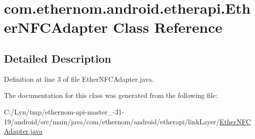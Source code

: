 \hypertarget{classcom_1_1ethernom_1_1android_1_1etherapi_1_1_ether_n_f_c_adapter}{}\section{com.\+ethernom.\+android.\+etherapi.\+Ether\+N\+F\+C\+Adapter Class Reference}
\label{classcom_1_1ethernom_1_1android_1_1etherapi_1_1_ether_n_f_c_adapter}


\subsection{Detailed Description}


Definition at line 3 of file Ether\+N\+F\+C\+Adapter.\+java.



The documentation for this class was generated from the following file\+:\begin{DoxyCompactItemize}
\item 
C\+:/\+Lyn/tmp/ethernom-\/api-\/master\+\_-\/31-\/19/android/src/main/java/com/ethernom/android/etherapi/link\+Layer/\mbox{\hyperlink{_ether_n_f_c_adapter_8java}{Ether\+N\+F\+C\+Adapter.\+java}}\end{DoxyCompactItemize}
